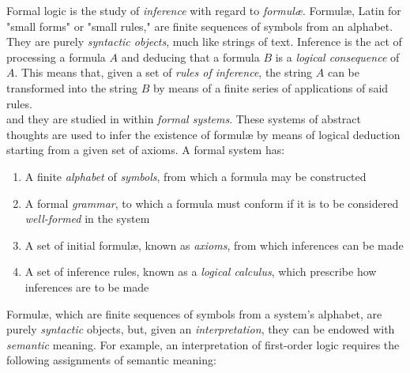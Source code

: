 
Formal logic is the study of \textit{inference} with regard to \textit{formul{\ae}}. Formul{\ae}, Latin for "small forms" or "small rules," are finite sequences of symbols from an alphabet. They are purely \textit{syntactic objects}, much like strings of text. Inference is the act of processing a formula $A$ and deducing that a formula $B$ is a \textit{logical consequence} of $A$. This means that, given a set of \textit{rules of inference}, the string $A$ can be transformed into the string $B$ by means of a finite series of applications of said rules. \\





and they are studied in within \textit{formal systems}. These systems of abstract thoughts are used to infer the existence of formul{\ae} by means of logical deduction starting from a given set of axioms. A formal system has:

\begin{enumerate}
	\item A finite \textit{alphabet} of \textit{symbols}, from which a formula may be constructed
	\item A formal \textit{grammar}, to which a formula must conform if it is to be considered \textit{well-formed} in the system
	\item A set of initial formul{\ae}, known as \textit{axioms}, from which inferences can be made
	\item A set of inference rules, known as a \textit{logical calculus}, which prescribe how inferences are to be made
\end{enumerate}


Formul{\ae}, which are finite sequences of symbols from a system's alphabet, are purely \textit{syntactic} objects, but, given an \textit{interpretation}, they can be endowed with \textit{semantic} meaning. For example, an interpretation of first-order logic requires the following assignments of semantic meaning:

